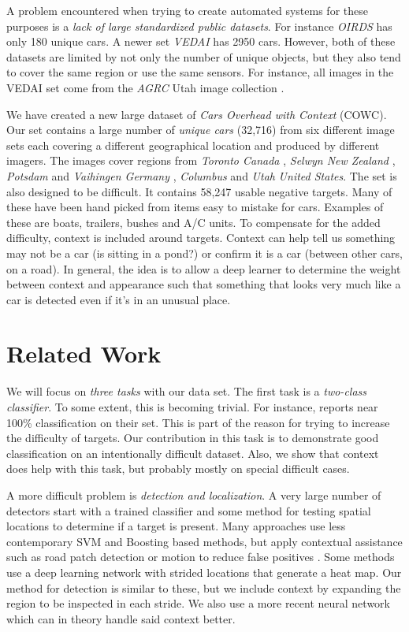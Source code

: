 \documentclass[runningheads]{llncs}
\begin{document}
A problem encountered when trying to create automated systems for these purposes is a {\it lack of large standardized public datasets}. For instance {\it OIRDS} \cite{OIRDS} has only 180 unique cars. A newer set {\it VEDAI} \cite{VEDAI} has 2950 cars. However, both of these datasets are limited by not only the number of unique objects, but they also tend to cover the same region or use the same sensors. For instance, all images in the VEDAI set come from the {\it AGRC} Utah image collection \cite{UtahData}. 

We have created a new large dataset of {\it Cars Overhead with Context} (COWC). Our set contains a large number of {\it unique cars} (32,716) from six different image sets each covering a different geographical location and produced by different imagers. The images cover regions from {\it Toronto Canada} \cite{TorontoData}, {\it Selwyn New Zealand} \cite{SelwynData}, {\it Potsdam} \cite{PotsdamData} and {\it Vaihingen Germany} \cite{VaihingenData}, {\it Columbus} \cite{ColumbusData} and {\it Utah} \cite{UtahData} {\it United States}.  The set is also designed to be difficult. It contains 58,247 usable negative targets. Many of these have been hand picked from items easy to mistake for cars. Examples of these are boats, trailers, bushes and A/C units. To compensate for the added difficulty, context is included around targets. Context can help tell us something may not be a car (is sitting in a pond?) or confirm it is a car (between other cars, on a road). In general, the idea is to allow a deep learner to determine the weight between context and appearance such that something that looks very much like a car is detected even if it's in an unusual place.

\section{Related Work}
We will focus on {\it three tasks} with our data set. The first task is a {\it two-class classifier}. To some extent, this is becoming trivial. For instance, \cite{Chen13} reports near 100\% classification on their set. This is part of the reason for trying to increase the difficulty of targets. Our contribution in this task is to demonstrate good classification on an intentionally difficult dataset. Also, we show that context does help with this task, but probably mostly on special difficult cases.  

A more difficult problem is {\it detection and localization}. A very large number of detectors start with a trained classifier and some method for testing spatial locations to determine if a target is present. Many approaches use less contemporary SVM and Boosting based methods, but apply contextual assistance such as road patch detection or motion to reduce false positives \cite{VEDAI,Moranduzzo14,Holt09,Kamenetsky15}. Some methods use a deep learning network with strided locations \cite{OrbitalInsight16,Chen13}  that generate a heat map. Our method for detection is similar to these, but we include context by expanding the region to be inspected in each stride. We also use a more recent neural network which can in theory handle said context better. 
\end{document}
